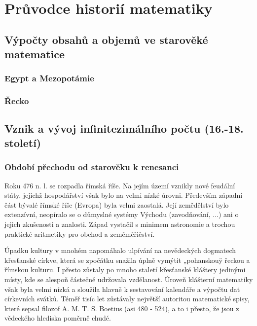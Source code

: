 \setchaptertoc
\chapter{Průvodce historií matematiky}\label{mai:OchapI}
  \section{Výpočty obsahů a objemů ve starověké matematice}\label{mai:OchapIsecI}
    \subsection{Egypt a Mezopotámie}\label{mai:OchapIsecIssecI}
    \subsection{Řecko}\label{mai:OchapIsecIssecII}
  \section{Vznik a vývoj infinitezimálního počtu (16.-18. století)}\label{mai:OchapIsecII}
    \subsection{Období přechodu od starověku k renesanci}
      Roku 476 n. l. se rozpadla římská říše. Na jejím území vznikly nové feudální státy, jejichž
      hospodářství však bylo na velmi nízké úrovni. Především západní část bývalé římské říše
      (Evropa) byla velmi zaostalá. Její zemědělství bylo extenzívní, neopíralo se o důmyslné
      systémy Východu (zavodňování, ...) ani o jejich zkušenosti a znalosti. Západ vystačil s
      minimem astronomie a trochou praktické aritmetiky pro obchod a zeměměřičství.

      Úpadku kultury v mnohém napomáhalo ulpívání na nevědeckých dogmatech křesťanské církve, která
      se zpočátku snažila úplně vymýtit „pohanskouÿ řeckou a římskou kulturu. I přesto zůstaly po
      mnoho staletí křesťanské kláštery jedinými místy, kde se alespoň částečně udržovala
      vzdělanost. Úroveň klášterní matematiky však byla velmi nízká a sloužila hlavně k sestavování
      kalendáře a výpočtu dat církevních svátků. Téměř tisíc let zůstávaly největší autoritou
      matematické spisy, které sepsal filozof A. M. T. S. Boetius (asi 480 - 524), a to i přesto, že
      jsou z vědeckého hlediska poměrně chudé.

